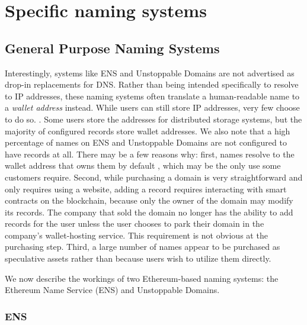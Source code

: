 \section{Specific naming systems}
\subsection{General Purpose Naming Systems}

Interestingly, systems like ENS and Unstoppable Domains are not advertised as 
drop-in replacements for DNS. Rather than being intended specifically to 
resolve to IP addresses, these naming systems often translate a human-readable 
name to a \emph{wallet address} instead. While users can still store IP 
addresses, very few choose to do so. . Some users store the addresses for distributed 
	storage 
systems, but the majority of configured records store wallet addresses. We also 
note that a high percentage of names on ENS and Unstoppable Domains are not 
configured to have records at all. There may be a few reasons why: first, names 
resolve to the wallet address that owns them by default , which may be the only use some customers require. Second, 
	while 
purchasing a domain is very straightforward and only requires using a website, 
adding a record requires interacting with smart contracts on the blockchain, 
because only the owner of the domain may modify its records. The company that 
sold the domain no longer has the ability to add records for the user unless 
the user chooses to park their domain in the company's wallet-hosting service. 
This requirement is not obvious at the purchasing step. Third, a large number 
of names appear to be purchased as speculative assets rather than because users 
wish to utilize them directly. 

We now describe the workings of two Ethereum-based naming systems: the 
Ethereum Name Service (ENS) and Unstoppable Domains. 
\subsubsection{ENS}

